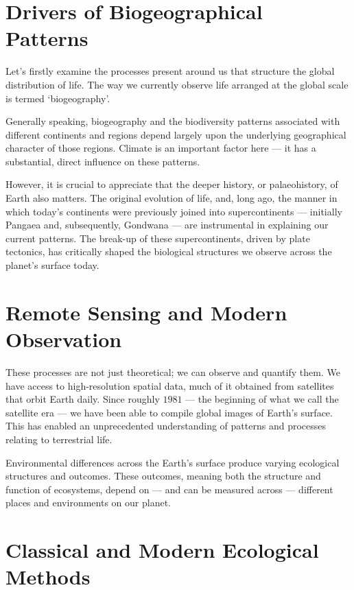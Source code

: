 \documentclass[
  11pt,
]{book}
\begin{document}
\section{Drivers of Biogeographical
Patterns}\label{drivers-of-biogeographical-patterns}

Let's firstly examine the processes present around us that structure the
global distribution of life. The way we currently observe life arranged
at the global scale is termed `biogeography'.

Generally speaking, biogeography and the biodiversity patterns
associated with different continents and regions depend largely upon the
underlying geographical character of those regions. Climate is an
important factor here --- it has a substantial, direct influence on
these patterns.

However, it is crucial to appreciate that the deeper history, or
palaeohistory, of Earth also matters. The original evolution of life,
and, long ago, the manner in which today's continents were previously
joined into supercontinents --- initially Pangaea and, subsequently,
Gondwana --- are instrumental in explaining our current patterns. The
break-up of these supercontinents, driven by plate tectonics, has
critically shaped the biological structures we observe across the
planet's surface today.

\section{Remote Sensing and Modern
Observation}\label{remote-sensing-and-modern-observation}

These processes are not just theoretical; we can observe and quantify
them. We have access to high-resolution spatial data, much of it
obtained from satellites that orbit Earth daily. Since roughly \(1981\)
--- the beginning of what we call the satellite era --- we have been
able to compile global images of Earth's surface. This has enabled an
unprecedented understanding of patterns and processes relating to
terrestrial life.

Environmental differences across the Earth's surface produce varying
ecological structures and outcomes. These outcomes, meaning both the
structure and function of ecosystems, depend on --- and can be measured
across --- different places and environments on our planet.

\section{Classical and Modern Ecological
Methods}\label{classical-and-modern-ecological-methods}
\end{document}
